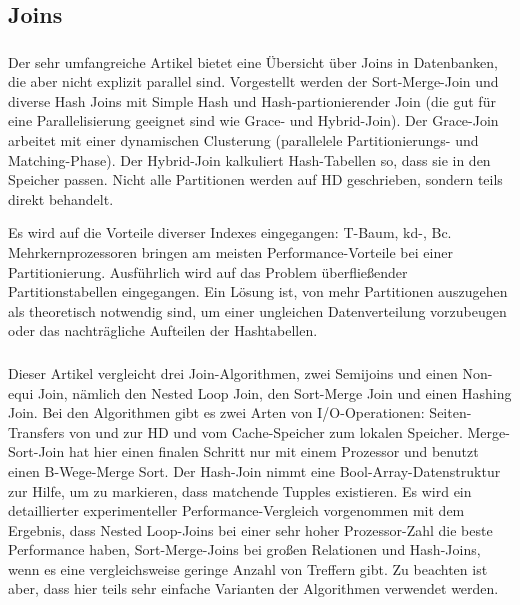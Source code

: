 \documentclass[a4paper,12pt,twoside]{article}
\begin{document}
\subsection{Joins}

\subsubsection*{}

Der sehr umfangreiche Artikel bietet eine Übersicht über Joins in Datenbanken, die aber nicht explizit parallel sind. Vorgestellt werden der Sort-Merge-Join und diverse Hash Joins mit Simple Hash und Hash-partionierender Join (die gut für eine Parallelisierung geeignet sind wie Grace- und Hybrid-Join). Der Grace-Join arbeitet mit einer dynamischen Clusterung (parallelele Partitionierungs- und Matching-Phase). Der Hybrid-Join kalkuliert Hash-Tabellen so, dass sie in den Speicher passen. Nicht alle Partitionen werden auf HD geschrieben, sondern teils direkt behandelt.

Es wird auf die Vorteile diverser Indexes eingegangen: T-Baum, kd-, Bc. Mehrkernprozessoren bringen am meisten Performance-Vorteile bei einer Partitionierung. Ausführlich wird auf das Problem überfließender Partitionstabellen eingegangen. Ein Lösung ist, von mehr Partitionen auszugehen als theoretisch notwendig sind, um einer ungleichen Datenverteilung vorzubeugen oder das nachträgliche Aufteilen der Hashtabellen.

\subsubsection*{}

Dieser Artikel vergleicht drei Join-Algorithmen, zwei Semijoins und einen Non-equi Join, nämlich den Nested Loop Join, den Sort-Merge Join und einen Hashing Join. Bei den Algorithmen gibt es zwei Arten von I/O-Operationen: Seiten-Transfers von und zur HD und vom Cache-Speicher zum lokalen Speicher. Merge-Sort-Join hat hier einen finalen Schritt nur mit einem Prozessor und benutzt einen B-Wege-Merge Sort. Der Hash-Join nimmt eine Bool-Array-Datenstruktur zur Hilfe, um zu markieren, dass matchende Tupples existieren. Es wird ein detaillierter experimenteller Performance-Vergleich vorgenommen mit dem Ergebnis, dass Nested Loop-Joins bei einer sehr hoher Prozessor-Zahl die beste Performance haben, Sort-Merge-Joins bei großen Relationen und Hash-Joins, wenn es eine vergleichsweise geringe Anzahl von Treffern gibt. Zu beachten ist aber, dass hier teils sehr einfache Varianten der Algorithmen verwendet werden.
\end{document}
